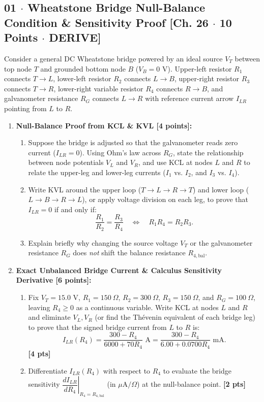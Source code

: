 \documentclass[10pt,letterpaper]{article}
\begin{document}
\subsection*{01 $\cdot$ Wheatstone Bridge Null-Balance Condition \& Sensitivity Proof \hfill [Ch. 26 $\cdot$ 10 Points $\cdot$ DERIVE]}

Consider a general DC Wheatstone bridge powered by an ideal source $V_T$ between top node $T$ and grounded bottom node $B$ ($V_B = 0\text{ V}$). Upper-left resistor $R_1$ connects $T \to L$, lower-left resistor $R_2$ connects $L \to B$, upper-right resistor $R_3$ connects $T \to R$, lower-right variable resistor $R_4$ connects $R \to B$, and galvanometer resistance $R_G$ connects $L \to R$ with reference current arrow $I_{LR}$ pointing from $L$ to $R$.

\begin{enumerate}
  \item \textbf{Null-Balance Proof from KCL \& KVL [4 points]:}
    \begin{enumerate}
      \item Suppose the bridge is adjusted so that the galvanometer reads zero current ($I_{LR} = 0$). Using Ohm's law across $R_G$, state the relationship between node potentials $V_L$ and $V_R$, and use KCL at nodes $L$ and $R$ to relate the upper-leg and lower-leg currents ($I_1$ vs. $I_2$, and $I_3$ vs. $I_4$).
      \item Write KVL around the upper loop ($T \to L \to R \to T$) and lower loop ($L \to B \to R \to L$), or apply voltage division on each leg, to prove that $I_{LR} = 0$ if and only if:
      $$\frac{R_1}{R_2} = \frac{R_3}{R_4} \quad \Longleftrightarrow \quad R_1 R_4 = R_2 R_3.$$
      \item Explain briefly why changing the source voltage $V_T$ or the galvanometer resistance $R_G$ does \emph{not} shift the balance resistance $R_{4,\text{bal}}$.
    \end{enumerate}
  
  \item \textbf{Exact Unbalanced Bridge Current \& Calculus Sensitivity Derivative [6 points]:}
    \begin{enumerate}
      \item Fix $V_T = 15.0\text{ V}$, $R_1 = 150\ \Omega$, $R_2 = 300\ \Omega$, $R_3 = 150\ \Omega$, and $R_G = 100\ \Omega$, leaving $R_4 \ge 0$ as a continuous variable. Write KCL at nodes $L$ and $R$ and eliminate $V_L, V_R$ (or find the Th\'evenin equivalent of each bridge leg) to prove that the signed bridge current from $L$ to $R$ is:
      $$I_{LR}(R_4) = \frac{300 - R_4}{6000 + 70 R_4}\text{ A} = \frac{300 - R_4}{6.00 + 0.0700 R_4}\text{ mA}.$$ \textbf{[4 pts]}
      \item Differentiate $I_{LR}(R_4)$ with respect to $R_4$ to evaluate the bridge sensitivity $\left.\dfrac{dI_{LR}}{dR_4}\right|_{R_4 = R_{4,\text{bal}}}$ (in $\mu\text{A}/\Omega$) at the null-balance point. \textbf{[2 pts]}
    \end{enumerate}
  
\end{enumerate}
\vspace{1.2in}
\end{document}
